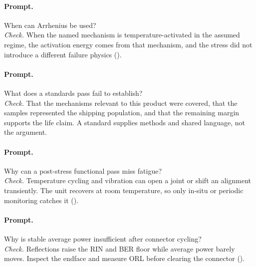 \paragraph{Prompt.} When can Arrhenius be used?\\
\textit{Check.} When the named mechanism is temperature-activated in the
assumed regime, the activation energy comes from that mechanism, and the stress
did not introduce a different failure physics ().

\paragraph{Prompt.} What does a standards pass fail to establish?\\
\textit{Check.} That the mechanisms relevant to this product were covered, that
the samples represented the shipping population, and that the remaining margin
supports the life claim. A standard supplies methods and shared language, not
the argument.

\paragraph{Prompt.} Why can a post-stress functional pass miss fatigue?\\
\textit{Check.} Temperature cycling and vibration can open a joint or shift an
alignment transiently. The unit recovers at room temperature, so only in-situ
or periodic monitoring catches it ().

\paragraph{Prompt.} Why is stable average power insufficient after connector
cycling?\\
\textit{Check.} Reflections raise the RIN and BER floor while average power
barely moves. Inspect the endface and measure ORL before clearing the connector
().

\FloatBarrier

